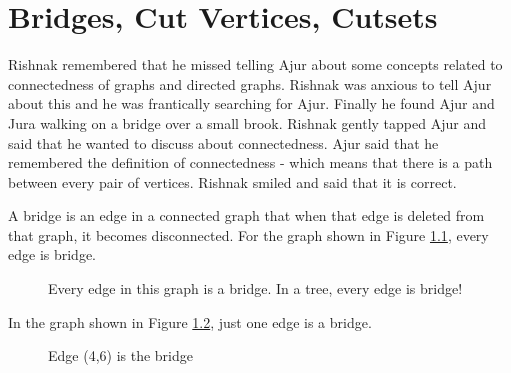 \chapter{Bridges, Cut Vertices, Cutsets}

Rishnak remembered that he missed telling Ajur about some concepts related to connectedness of graphs and directed graphs. Rishnak was anxious to tell Ajur about this and he was frantically searching for Ajur. Finally he found Ajur and Jura walking on a bridge over a small brook. Rishnak gently tapped Ajur and said that 
he wanted to discuss about connectedness. Ajur said that he remembered the definition of connectedness - which means that there is a path between every pair of vertices. Rishnak smiled and said that it is correct.

A bridge is an edge in a connected graph that when that edge is deleted from that graph, it becomes disconnected. For the graph shown in Figure \ref{14g1}, every edge is bridge.
\begin{figure}
\begin{center}

\caption{ Every edge in this graph is a bridge. In a tree, every edge is bridge!}\label{14g1}
\end{center}
\end{figure}

In the graph shown in Figure \ref{14g2}, just one edge is a bridge.

\begin{figure}
\begin{center}
\caption{Edge (4,6) is the bridge}\label{14g2}
\end{center}
\end{figure}

